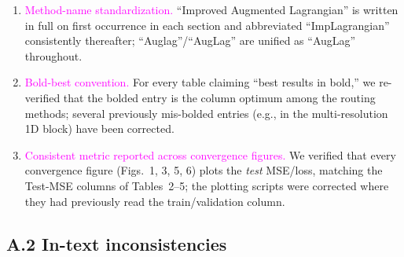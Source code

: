 \documentclass{article}
\newcommand{\audit}[1]{\textcolor{magenta}{#1}}  %
\begin{document}
\begin{enumerate}[leftmargin=*,itemsep=0.4em]
    \item \audit{Method-name standardization.} ``Improved Augmented Lagrangian''
    is written in full on first occurrence in each section and abbreviated
    ``ImpLagrangian'' consistently thereafter; ``Auglag''/``AugLag'' are unified
    as ``AugLag'' throughout.

    \item \audit{Bold-best convention.} For every table claiming ``best results
    in bold,'' we re-verified that the bolded entry is the column optimum among
    the routing methods; several previously mis-bolded entries (e.g., in the
    multi-resolution 1D block) have been corrected.

    \item \audit{Consistent metric reported across convergence figures.} We
    verified that every convergence figure (Figs.~1, 3, 5, 6) plots the
    \emph{test} MSE/loss, matching the Test-MSE columns of Tables~2--5; the
    plotting scripts were corrected where they had previously read the
    train/validation column.
\end{enumerate}

\subsection*{A.2 In-text inconsistencies}
\end{document}
